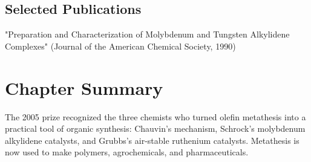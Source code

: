 \subsection*{Selected Publications}

"Preparation and Characterization of Molybdenum and Tungsten Alkylidene Complexes" (Journal of the American Chemical Society, 1990)

\clearpage

\section*{Chapter Summary}

The 2005 prize recognized the three chemists who turned olefin metathesis into a practical tool of organic synthesis: Chauvin's mechanism, Schrock's molybdenum alkylidene catalysts, and Grubbs's air-stable ruthenium catalysts. Metathesis is now used to make polymers, agrochemicals, and pharmaceuticals.
